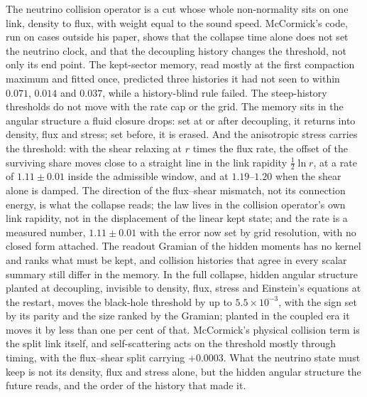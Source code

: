 \documentclass[11pt]{article}
\begin{document}
The neutrino collision operator is a cut whose whole non-normality sits on one link, density to flux, with weight equal to the sound speed. McCormick's code, run on cases outside his paper, shows that the collapse time alone does not set the neutrino clock, and that the decoupling history changes the threshold, not only its end point. The kept-sector memory, read mostly at the first compaction maximum and fitted once, predicted three histories it had not seen to within $0.071$, $0.014$ and $0.037$, while a history-blind rule failed. The steep-history thresholds do not move with the rate cap or the grid. The memory sits in the angular structure a fluid closure drops: set at or after decoupling, it returns into density, flux and stress; set before, it is erased. And the anisotropic stress carries the threshold: with the shear relaxing at $r$ times the flux rate, the offset of the surviving share moves close to a straight line in the link rapidity $\tfrac12\ln r$, at a rate of $1.11\pm0.01$ inside the admissible window, and at $1.19$--$1.20$ when the shear alone is damped. The direction of the flux--shear mismatch, not its connection energy, is what the collapse reads; the law lives in the collision operator's own link rapidity, not in the displacement of the linear kept state; and the rate is a measured number, $1.11\pm0.01$ with the error now set by grid resolution, with no closed form attached. The readout Gramian of the hidden moments has no kernel and ranks what must be kept, and collision histories that agree in every scalar summary still differ in the memory. In the full collapse, hidden angular structure planted at decoupling, invisible to density, flux, stress and Einstein's equations at the restart, moves the black-hole threshold by up to $5.5\times10^{-3}$, with the sign set by its parity and the size ranked by the Gramian; planted in the coupled era it moves it by less than one per cent of that. McCormick's physical collision term is the split link itself, and self-scattering acts on the threshold mostly through timing, with the flux--shear split carrying $+0.0003$. What the neutrino state must keep is not its density, flux and stress alone, but the hidden angular structure the future reads, and the order of the history that made it.
\end{document}
